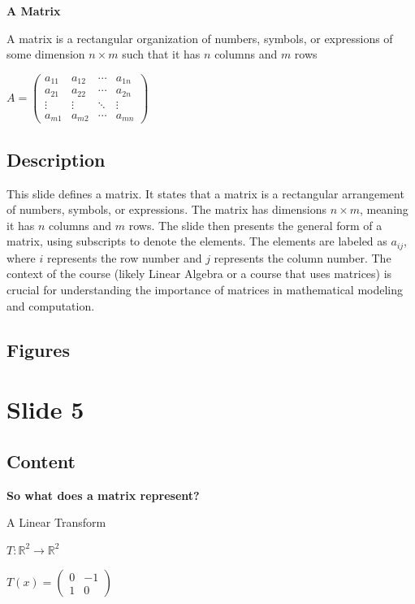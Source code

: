 \documentclass{article}%
\begin{document}
\textbf{A Matrix}

A matrix is a rectangular organization of numbers, symbols, or expressions of some dimension $n \times m$ such that it has $n$ columns and $m$ rows

$A = \begin{pmatrix}
a_{11} & a_{12} & \cdots & a_{1n} \\
a_{21} & a_{22} & \cdots & a_{2n} \\
\vdots & \vdots & \ddots & \vdots \\
a_{m1} & a_{m2} & \cdots & a_{mn}
\end{pmatrix}$
%
\subsection{Description}%
This slide defines a matrix.  It states that a matrix is a rectangular arrangement of numbers, symbols, or expressions.  The matrix has dimensions $n \times m$, meaning it has $n$ columns and $m$ rows.  The slide then presents the general form of a matrix, using subscripts to denote the elements.  The elements are labeled as $a_{ij}$, where $i$ represents the row number and $j$ represents the column number.  The context of the course (likely Linear Algebra or a course that uses matrices) is crucial for understanding the importance of matrices in mathematical modeling and computation.%
\subsection{Figures}%
\begin{figure}[H]%
\centering%
\end{figure}

%
\newpage%
\section{Slide 5}%
\label{sec:Slide5}%
\subsection{Content}%

\textbf{So what does a matrix represent?}

A Linear Transform

$T: \mathbb{R}^2 \rightarrow \mathbb{R}^2$

$T(x) = \begin{pmatrix} 0 & -1 \\ 1 & 0 \end{pmatrix}$
\end{document}
